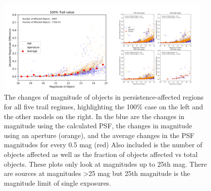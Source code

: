 \documentclass[DM,authoryear,toc]{lsstdoc}
\begin{document}
\begin{figure}[!htp]
  \centering
  \includegraphics[width=0.95\textwidth, angle=0]{Combined_New_mag_plot.png}
  \caption{
  The changes of magnitude of objects in persistence-affected regions for all five trail regimes, highlighting the 100\% case on the left and the other models on the right. 
  In the blue are the changes in magnitude using the calculated PSF, the changes in magnitude using an aperture (orange), and the average changes in the PSF magnitudes for every 0.5 mag (red)
  Also included is the number of objects affected as well as the fraction of objects affected vs total objects.
  These plots only look at magnitudes up to 25th mag.
  There are sources at magnitudes >25 mag but 25th magnitude is the magnitude limit of single exposures.
  }\label{fig:affected_objects_all}
\end{figure}





\end{document}
